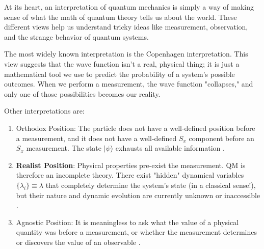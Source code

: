 \documentclass{article}
\begin{document}
At its heart, an interpretation of quantum mechanics is simply a way of making sense of what the math of quantum theory tells us about the world. These different views help us understand tricky ideas like measurement, observation, and the strange behavior of quantum systems.

The most widely known interpretation is the Copenhagen interpretation. This view suggests that the wave function isn't a real, physical thing; it is just a mathematical tool we use to predict the probability of a system's possible outcomes. When we perform a measurement, the wave function "collapses," and only one of those possibilities becomes our reality.

Other interpretations are:
\begin{enumerate}
    \item Orthodox Position: The particle does not have a well-defined position before a measurement, and it does not have a well-defined $S_x$ component before an $S_x$ measurement. The state $|\psi\rangle$ exhausts all available information \cite{lorenzomagnea}.
    \item \textbf{Realist Position}: Physical properties pre-exist the measurement. QM is therefore an incomplete theory. There exist "hidden" dynamical variables $\{\lambda_i\}\equiv\lambda$ that completely determine the system's state (in a classical sense!), but their nature and dynamic evolution are currently unknown or inaccessible \cite{lorenzomagnea}.
    \item Agnostic Position: It is meaningless to ask what the value of a physical quantity was before a measurement, or whether the measurement determines or discovers the value of an observable \cite{lorenzomagnea}.
\end{enumerate}
\end{document}
